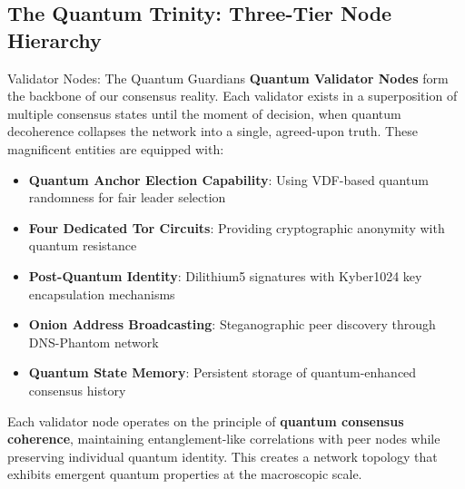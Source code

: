 \documentclass[11pt,a4paper]{article}
\begin{document}
\subsection{The Quantum Trinity: Three-Tier Node Hierarchy}

\begin{nodebox}{Validator Nodes: The Quantum Guardians}
\textbf{Quantum Validator Nodes} form the backbone of our consensus reality. Each validator exists in a superposition of multiple consensus states until the moment of decision, when quantum decoherence collapses the network into a single, agreed-upon truth. These magnificent entities are equipped with:

\begin{itemize}
\item \textbf{Quantum Anchor Election Capability}: Using VDF-based quantum randomness for fair leader selection
\item \textbf{Four Dedicated Tor Circuits}: Providing cryptographic anonymity with quantum resistance
\item \textbf{Post-Quantum Identity}: Dilithium5 signatures with Kyber1024 key encapsulation mechanisms  
\item \textbf{Onion Address Broadcasting}: Steganographic peer discovery through DNS-Phantom network
\item \textbf{Quantum State Memory}: Persistent storage of quantum-enhanced consensus history
\end{itemize}

Each validator node operates on the principle of \textbf{quantum consensus coherence}, maintaining entanglement-like correlations with peer nodes while preserving individual quantum identity. This creates a network topology that exhibits emergent quantum properties at the macroscopic scale.
\end{nodebox}
\end{document}
